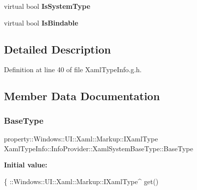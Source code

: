 \begin{DoxyCompactItemize}
\item 
\mbox{\label{class_xaml_type_info_1_1_info_provider_1_1_xaml_system_base_type_a82a37d086e3f3d77ae6e7b0edc298993}} 
virtual bool {\bfseries Is\+System\+Type}
\item 
\mbox{\label{class_xaml_type_info_1_1_info_provider_1_1_xaml_system_base_type_ac4f01b414cc3ac7fba3dbab20a8989f6}} 
virtual bool {\bfseries Is\+Bindable}
\end{DoxyCompactItemize}


\subsection{Detailed Description}


Definition at line 40 of file Xaml\+Type\+Info.\+g.\+h.



\subsection{Member Data Documentation}
\mbox{\label{class_xaml_type_info_1_1_info_provider_1_1_xaml_system_base_type_aa97518aef4b7922035e75ee3ef34f425}} 
\subsubsection{\texorpdfstring{Base\+Type}{BaseType}}
{\footnotesize\ttfamily property\+::\+Windows\+::\+U\+I\+::\+Xaml\+::\+Markup\+::\+I\+Xaml\+Type Xaml\+Type\+Info\+::\+Info\+Provider\+::\+Xaml\+System\+Base\+Type\+::\+Base\+Type}

{\bfseries Initial value\+:}
\begin{DoxyCode}
\{
                ::Windows::UI::Xaml::Markup::IXamlType^ \textcolor{keyword}{get}()
\end{DoxyCode}



